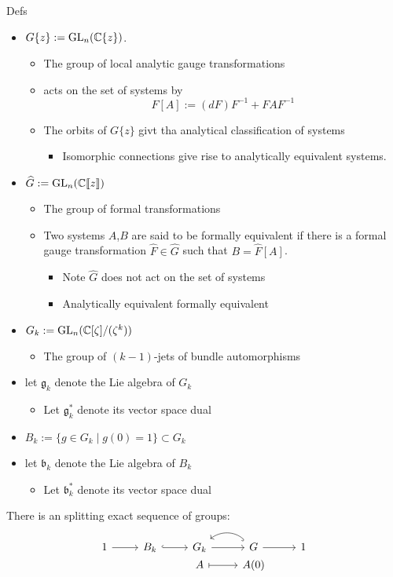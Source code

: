 \begin{frame}[fragile]{Defs}
  \begin{itemize}
    \item $G\{z\}:=\operatorname{GL}_n(\mathbb{C}\{z\})$.
      \begin{itemize}
        \item The group of local analytic gauge transformations
        \item acts on the set of systems by
          \[
            F[A]:=(dF)F^{-1}+FAF^{-1}
          \]
        \item The orbits of $G\{z\}$ givt tha analytical classification of
          systems
          \begin{itemize}
            \item Isomorphic connections give rise to analytically equivalent
              systems.
          \end{itemize}
      \end{itemize}
    \item $\widehat G:=\operatorname{GL}_n(\mathbb{C}\llbracket z\rrbracket)$
      \begin{itemize}
        \item The group of formal transformations
        \item Two systems $A$,$B$ are said to be formally equivalent if there
          is a formal gauge transformation $\hat F\in\hat G$ such that
          $B=\hat F[A]$.
          \begin{itemize}
            \item Note $\hat G$ does not act on the set of systems
            \item Analytically equivalent \Rightarrow formally equivalent
          \end{itemize}
      \end{itemize}
    \item $G_k:=\operatorname{GL}_n(\mathbb{C}[\zeta]/(\zeta^k))$
      \begin{itemize}
        \item The group of $(k-1)$-jets of bundle automorphisms
      \end{itemize}
    \item let $\mathfrak{g}_k$ denote the Lie algebra of $G_k$
    \begin{itemize}
      \item Let $\mathfrak{g}_k^*$ denote its vector space dual
    \end{itemize}
    \item $B_k:=\{g\in G_k\mid g(0)=1\}\subset G_k$
    \item let $\mathfrak{b}_k$ denote the Lie algebra of $B_k$
    \begin{itemize}
      \item Let $\mathfrak{b}_k^*$ denote its vector space dual
    \end{itemize}
  \end{itemize}
  There is an splitting exact sequence of groups:
  \[ \begin{tikzcd}[row sep=0]
  1 \rar & B_k \arrow[hook]{r} & G_k \rar & G \arrow[hook,bend right=40]{l}
    \rar & 1\\
  & & A \arrow[|->]{r}& A(0)
  \end{tikzcd} \]
\end{frame}

